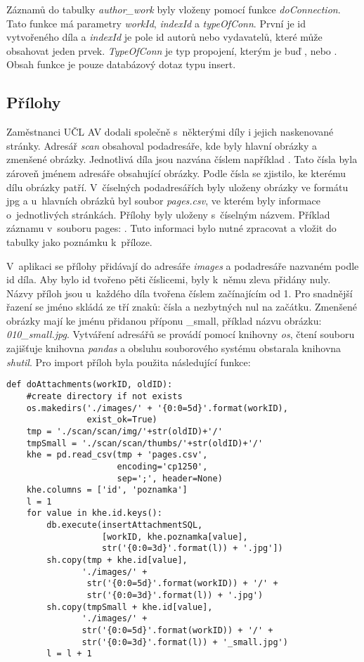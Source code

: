             Záznamů do tabulky \textit{author\_work} byly vloženy pomocí funkce \textit{doConnection}. Tato funkce má parametry \textit{workId}, \textit{indexId} a \textit{typeOfConn}. První je id vytvořeného díla a \textit{indexId} je pole id autorů nebo vydavatelů, které může obsahovat jeden prvek. \textit{TypeOfConn} je typ propojení, kterým je buď , nebo . Obsah funkce je pouze databázový dotaz typu insert.
            
        \subsection{Přílohy}
            Zaměstnanci UČL AV dodali společně s~některými díly i jejich naskenované stránky. Adresář \textit{scan} obsahoval  podadresáře, kde byly hlavní obrázky a zmenšené obrázky. Jednotlivá díla jsou nazvána číslem například . Tato čísla byla zároveň jménem adresáře obsahující obrázky. Podle čísla se zjistilo, ke kterému dílu obrázky patří. V~číselných podadresářích byly uloženy obrázky ve formátu jpg a u~hlavních obrázků byl soubor \textit{pages.csv}, ve kterém byly informace o~jednotlivých stránkách. Přílohy byly uloženy s~číselným názvem. Příklad záznamu v~souboru pages: . Tuto informaci bylo nutné zpracovat a vložit do tabulky jako poznámku k~příloze. 
            
            V~aplikaci se přílohy přidávají do adresáře \textit{images} a podadresáře nazvaném podle id díla. Aby bylo id tvořeno pěti číslicemi, byly k~němu zleva přidány nuly. Názvy příloh jsou u~každého díla tvořena číslem začínajícím od 1. Pro snadnější řazení se jméno skládá ze tří znaků: čísla a nezbytných nul na začátku. Zmenšené obrázky mají ke jménu přidanou příponu \_small, příklad názvu obrázku: \textit{010\_small.jpg}. Vytváření adresářů se provádí pomocí knihovny \textit{os}, čtení souboru zajišťuje knihovna \textit{pandas} a obsluhu souborového systému obstarala knihovna \textit{shutil}. Pro import příloh byla použita následující funkce:

\pagebreak
            \begin{verbatim}
def doAttachments(workID, oldID):
    #create directory if not exists
    os.makedirs('./images/' + '{0:0=5d}'.format(workID),
                exist_ok=True)
    tmp = './scan/scan/img/'+str(oldID)+'/'
    tmpSmall = './scan/scan/thumbs/'+str(oldID)+'/'
    khe = pd.read_csv(tmp + 'pages.csv',
                      encoding='cp1250',
                      sep=';', header=None)
    khe.columns = ['id', 'poznamka']
    l = 1
    for value in khe.id.keys():
        db.execute(insertAttachmentSQL,
                   [workID, khe.poznamka[value],
                   str('{0:0=3d}'.format(l)) + '.jpg'])
        sh.copy(tmp + khe.id[value], 
               './images/' + 
                str('{0:0=5d}'.format(workID)) + '/' +
                str('{0:0=3d}'.format(l)) + '.jpg')
        sh.copy(tmpSmall + khe.id[value], 
               './images/' + 
               str('{0:0=5d}'.format(workID)) + '/' +
               str('{0:0=3d}'.format(l)) + '_small.jpg')
        l = l + 1
            \end{verbatim}

